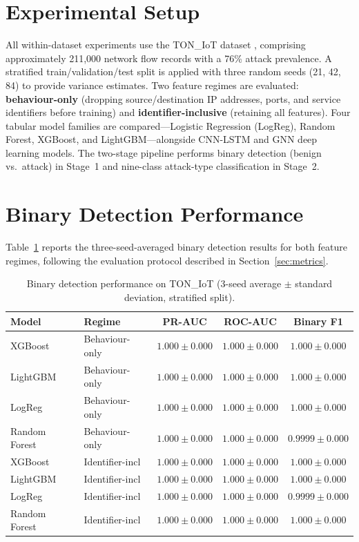 \documentclass[12pt,a4paper]{report}
\begin{document}
\section{Experimental Setup}
\label{sec:setup}

All within-dataset experiments use the TON\_IoT dataset \citep{alsaedi2020}, comprising approximately 211,000 network flow records with a 76\% attack prevalence. A stratified train/validation/test split is applied with three random seeds (21, 42, 84) to provide variance estimates. Two feature regimes are evaluated: \textbf{behaviour-only} (dropping source/destination IP addresses, ports, and service identifiers before training) and \textbf{identifier-inclusive} (retaining all features). Four tabular model families are compared---Logistic Regression (LogReg), Random Forest, XGBoost, and LightGBM---alongside CNN-LSTM and GNN deep learning models. The two-stage pipeline performs binary detection (benign vs.\ attack) in Stage~1 and nine-class attack-type classification in Stage~2.

\section{Binary Detection Performance}
\label{sec:binary-results}

Table~\ref{tab:binary} reports the three-seed-averaged binary detection results for both feature regimes, following the evaluation protocol described in Section~\ref{sec:metrics}.

\begin{table}[H]
\centering
\caption{Binary detection performance on TON\_IoT (3-seed average $\pm$ standard deviation, stratified split).}
\label{tab:binary}
\begin{tabular}{llccc}
\toprule
\textbf{Model} & \textbf{Regime} & \textbf{PR-AUC} & \textbf{ROC-AUC} & \textbf{Binary F1} \\
\midrule
XGBoost & Behaviour-only & $1.000 \pm 0.000$ & $1.000 \pm 0.000$ & $1.000 \pm 0.000$ \\
LightGBM & Behaviour-only & $1.000 \pm 0.000$ & $1.000 \pm 0.000$ & $1.000 \pm 0.000$ \\
LogReg & Behaviour-only & $1.000 \pm 0.000$ & $1.000 \pm 0.000$ & $1.000 \pm 0.000$ \\
Random Forest & Behaviour-only & $1.000 \pm 0.000$ & $1.000 \pm 0.000$ & $0.9999 \pm 0.000$ \\
\midrule
XGBoost & Identifier-incl & $1.000 \pm 0.000$ & $1.000 \pm 0.000$ & $1.000 \pm 0.000$ \\
LightGBM & Identifier-incl & $1.000 \pm 0.000$ & $1.000 \pm 0.000$ & $1.000 \pm 0.000$ \\
LogReg & Identifier-incl & $1.000 \pm 0.000$ & $1.000 \pm 0.000$ & $0.9999 \pm 0.000$ \\
Random Forest & Identifier-incl & $1.000 \pm 0.000$ & $1.000 \pm 0.000$ & $1.000 \pm 0.000$ \\
\bottomrule
\end{tabular}
\end{table}
\end{document}
